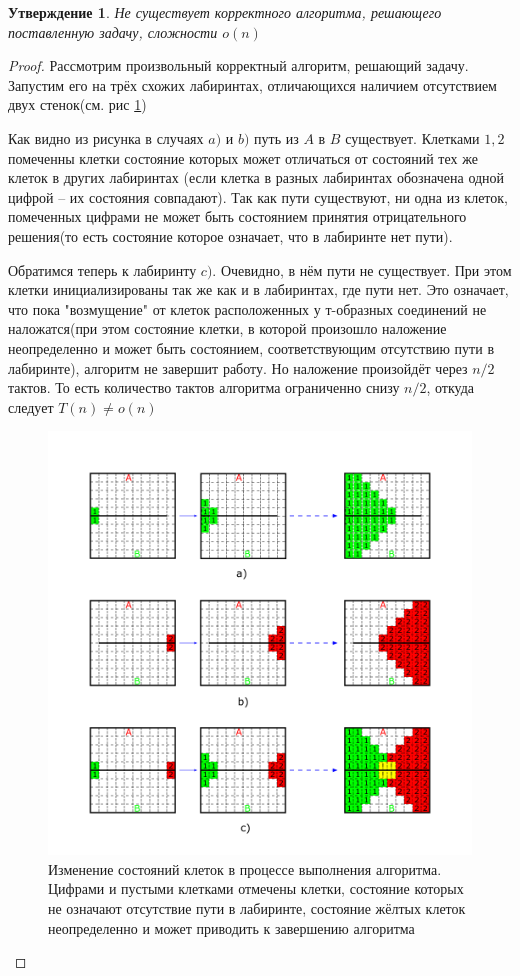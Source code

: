 \documentclass[12pt]{article}
\newtheorem*{claim*}{Утверждение}
\begin{document}
\begin{claim*}
	Не существует корректного алгоритма, решающего поставленную задачу, сложности $o(n)$
\end{claim*}
\begin{proof}
	Рассмотрим произвольный корректный алгоритм, решающий задачу. Запустим его на трёх схожих лабиринтах, отличающихся наличием отсутствием двух стенок(см. рис \ref{fig:unsolved})
	
	Как видно из рисунка в случаях $a)$ и $b)$ путь из  $A$ в $B$ существует. Клетками $1,2$ помеченны клетки состояние которых может отличаться от состояний тех же клеток в других лабиринтах (если клетка в разных лабиринтах обозначена одной цифрой -- их состояния совпадают). Так как пути существуют, ни одна из клеток, помеченных цифрами не может быть состоянием принятия отрицательного решения(то есть состояние которое означает, что в лабиринте нет пути).
	
	Обратимся теперь к лабиринту $c)$. Очевидно, в нём пути не существует. При этом клетки инициализированы так же как и в лабиринтах, где пути нет. Это означает, что пока "возмущение" от клеток расположенных у т-образных соединений не наложатся(при этом состояние клетки, в которой произошло наложение неопределенно и может быть состоянием, соответствующим отсутствию пути в лабиринте), алгоритм не завершит работу. Но наложение произойдёт через $n/2$ тактов. То есть количество тактов алгоритма ограниченно снизу $n/2$, откуда следует $T(n) \neq o(n)$
	
	\begin{figure}[H]
	 	  \centering
          \includegraphics[width=0.8\linewidth]{unsolved}
          \caption{Изменение состояний клеток в процессе выполнения алгоритма. Цифрами и пустыми клетками отмечены клетки, состояние которых не означают отсутствие пути в лабиринте, состояние жёлтых клеток неопределенно и может приводить к завершению алгоритма}
         \label{fig:unsolved}
     \end{figure}
\end{proof}
\end{document}
